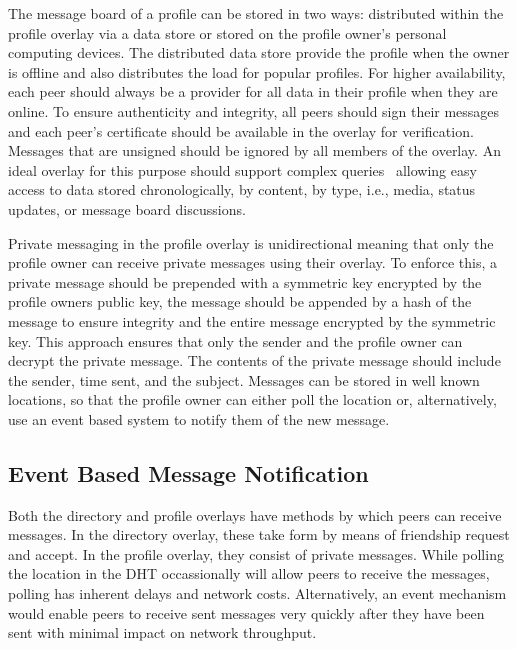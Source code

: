 \documentclass[conference]{IEEEtran}
\begin{document}
The message board of a profile can be stored in two ways: distributed within
the profile overlay via a data store or stored on the profile owner's personal
computing devices.  The distributed data store provide the profile when the
owner is offline and also distributes the load for popular profiles.  For
higher availability, each peer should always be a provider for all data in
their profile when they are online.  To ensure authenticity and integrity, all
peers should sign their messages and each peer's certificate should be
available in the overlay for verification.  Messages that are unsigned should
be ignored by all members of the overlay.  An ideal overlay for this purpose
should support complex queries~\cite{complex_queries} allowing easy access to
data stored chronologically, by content, by type, i.e., media, status updates,
or message board discussions.

Private messaging in the profile overlay is unidirectional meaning that only
the profile owner can receive private messages using their overlay.  To
enforce this, a private message should be prepended with a symmetric key
encrypted by the profile owners public key, the message should be appended by
a hash of the message to ensure integrity and the entire message encrypted by
the symmetric key.  This approach ensures that only the sender and the profile
owner can decrypt the private message.  The contents of the private message
should include the sender, time sent, and the subject.  Messages can be stored
in well known locations, so that the profile owner can either poll the
location or, alternatively, use an event based system to notify them of the
new message.

\subsection{Event Based Message Notification}

Both the directory and profile overlays have methods by which peers can receive
messages.  In the directory overlay, these take form by means of friendship
request and accept.  In the profile overlay, they consist of private messages.
While polling the location in the DHT occassionally will allow peers to
receive the messages, polling has inherent delays and network costs.
Alternatively, an event mechanism would enable peers to receive sent messages
very quickly after they have been sent with minimal impact on network
throughput.
\end{document}
